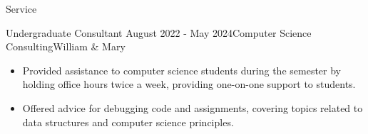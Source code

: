 \begin{rSection}{Service}
    \begin{rSubsection}{Undergraduate Consultant} {August 2022 - May 2024}{Computer Science Consulting}{\small{William \& Mary}}
    \begin{itemize}
        \item Provided assistance to computer science students during the semester by holding office hours twice a week, providing one-on-one support to students. 
        \item Offered advice for debugging code and assignments, covering topics related to data structures and computer science principles.
    \end{itemize}
    \end{rSubsection}
        
\end{rSection}